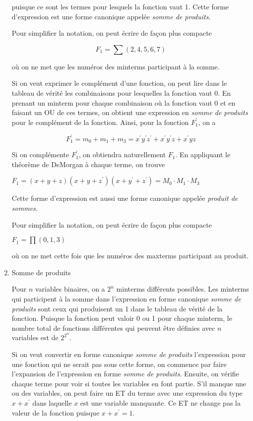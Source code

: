 \documentclass[letter, oneside]{book}
\begin{document}
\begin{enumerate}
puisque ce sont les termes pour lesquels la fonction vaut 1. Cette
forme d'expression est une forme canonique appelée \emph{somme de
produits}.

Pour simplifier la notation, on peut écrire de façon plus compacte  

$$F_1 = \sum (2, 4, 5, 6, 7)$$

où on ne met que les numéros des minterms participant à la somme.

Si on veut exprimer le complément d'une fonction, on peut lire dans le
tableau de vérité les combinaisons pour lesquelles la fonction
vaut 0. En prenant un minterm pour chaque combinaison où la fonction
vaut 0 et en faisant un OU de ces termes, on obtient une expression en
\emph{somme de produits} pour le complément de la fonction. Ainsi, pour la
fonction \(F_1^\prime\), on a

$$ F_1^\prime = m_0 + m_1 + m_3 = x^\prime y^\prime z^\prime +
x^\prime y^\prime z + x^\prime y z $$

Si on complémente \(F_1^\prime\), on obtiendra naturellement
\(F_1\). En appliquant le théorème de DeMorgan à chaque terme, on
trouve

\(F_1 = (x+ y+ z)(x + y + z^\prime)(x + y^\prime + z^\prime) = M_0
\cdot M_1 \cdot M_3\)

Cette forme d'expression est aussi une forme canonique appelée
\emph{produit de sommes}.

Pour simplifier la notation, on peut écrire de façon plus compacte  

\(F_1 = \prod (0,1,3)\)

où on ne met cette fois que les numéros des maxterms participant au
produit.

\item Somme de produits
\label{sec:org0a785f9}

Pour \(n\) variables binaires, on a \(2^n\) minterms différents
possibles. Les minterms qui participent à la somme dans l'expression
en forme canonique \emph{somme de produits} sont ceux qui produisent un 1
dans le tableau de vérité de la fonction. Puisque la fonction peut
valoir 0 ou 1 pour chaque minterm, le nombre total de fonctions
différentes qui peuvent être définies avec \(n\) variables est de
\(2^{2^n}\).

Si on veut convertir en forme canonique \emph{somme de produits} l'expression
pour une fonction qui ne serait pas sous cette forme, on commence par
faire l'expansion de l'expression en forme \emph{somme de produits}. Ensuite,
on vérifie chaque terme pour voir si toutes les variables en font
partie. S'il manque une ou des variables, on peut faire un ET du
terme avec une expression du type \(x + x^\prime\) dans laquelle \(x\)
est une variable manquante. Ce ET ne change pas la valeur de la
fonction puisque \(x + x^\prime = 1\).


\end{enumerate}
\end{document}
